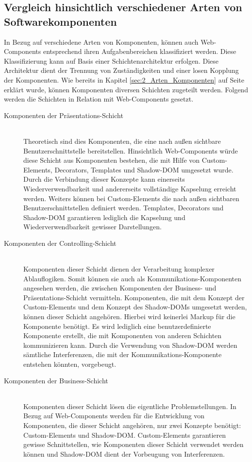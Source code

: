 \subsection{Vergleich hinsichtlich verschiedener Arten von Softwarekomponenten}
In Bezug auf verschiedene Arten von Komponenten, können auch Web-Components entsprechend ihren Aufgabenbereichen klassifiziert werden. Diese Klassifizierung kann auf Basis einer Schichtenarchitektur erfolgen. Diese Architektur dient der Trennung von Zuständigkeiten und einer losen Kopplung der Komponenten. Wie bereits in Kapitel \ref{sec:2_Arten_Komponenten} auf Seite \pageref{sec:2_Arten_Komponenten} erklärt wurde, können Komponenten diversen Schichten zugeteilt werden. Folgend werden die Schichten in Relation mit Web-Components gesetzt.

\begin{description}
\item[Komponenten der Präsentations-Schicht] \hfill \\
Theoretisch sind dies Komponenten, die eine nach außen sichtbare Benutzerschnittstelle bereitstellen. Hinsichtlich Web-Components würde diese Schicht aus Komponenten bestehen, die mit Hilfe von Custom-Elements, Decorators, Templates und Shadow-DOM umgesetzt wurde. Durch die Verbindung dieser Konzepte kann einerseits Wiederverwendbarkeit und andererseits vollständige Kapselung erreicht werden. Weiters können bei Custom-Elements die nach außen sichtbaren Benutzerschnittstellen definiert werden. Templates, Decorators und Shadow-DOM garantieren lediglich die Kapselung und Wiederverwendbarkeit gewisser Darstellungen.

\item[Komponenten der Controlling-Schicht] \hfill \\
Komponenten dieser Schicht dienen der Verarbeitung komplexer Ablauflogiken. Somit können sie auch als Kommunikations-Komponenten angesehen werden, die zwischen Komponenten der Business- und Präsentations-Schicht vermitteln. Komponenten, die mit dem Konzept der Custom-Elements und dem Konzept des Shadow-DOMs umgesetzt werden, können dieser Schicht angehören. Hierbei wird keinerlei Markup für die Komponente benötigt. Es wird lediglich eine benutzerdefinierte Komponente erstellt, die mit Komponenten von anderen Schichten kommunizieren kann. Durch die Verwendung von Shadow-DOM werden sämtliche Interferenzen, die mit der Kommunikations-Komponente entstehen könnten, vorgebeugt.

\item[Komponenten der Business-Schicht] \hfill \\
Komponenten dieser Schicht lösen die eigentliche Problemstellungen. In Bezug auf Web-Components werden für die Entwicklung von Komponenten, die dieser Schicht angehören, nur zwei Konzepte benötigt: Custom-Elements und Shadow-DOM. Custom-Elements garantieren gewisse Schnittstellen, wie Komponenten dieser Schicht verwendet werden können und Shadow-DOM dient der Vorbeugung von Interferenzen.


\end{description}
